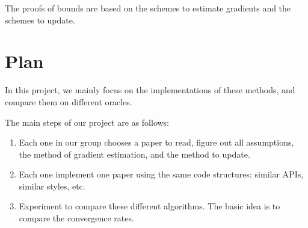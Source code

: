 \documentclass[a4paper,twocolumn]{article}
\begin{document}
The proofs of bounds are based on the schemes to estimate gradients and the schemes to update.

\section{Plan}

In this project, we mainly focus on the implementations of these methods, and compare them on different oracles.

The main steps of our project are as follows:
\begin{enumerate}
\item Each one in our group chooses a paper to read, figure out all assumptions, the method of gradient estimation, and the method to update.
\item Each one implement one paper using the same code structures: similar APIs, similar styles, etc.
\item Experiment to compare these different algorithms. The basic idea is to compare the convergence rates.
\end{enumerate}










 

\end{document}
